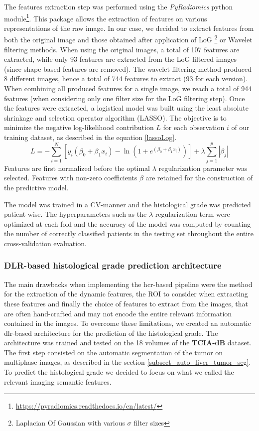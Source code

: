 \documentclass[]{article}
\newcommand{\lmttfont}[1]{{\fontfamily{lmtt}\selectfont #1}}
\begin{document}
The features extraction step was performed using the \textit{PyRadiomics} python module\footnote{\url{https://pyradiomics.readthedocs.io/en/latest/}}. This package allows the extraction of features on various representations of the raw image. In our case, we decided to extract features from both the original image and those obtained after application of LoG \footnote{Laplacian Of Gaussian with various $\sigma$ filter sizes} or Wavelet filtering methods. When using the original images, a total of 107 features are extracted, while only 93 features are extracted from the LoG filtered images (since shape-based features are removed). The wavelet filtering method produced 8 different images, hence a total of 744 features to extract (93 for each version). When combining all produced features for a single image, we reach a total of 944 features (when considering only one filter size for the LoG filtering step).
Once the features were extracted, a logistical model was built using the least absolute shrinkage and selection operator algorithm (LASSO). The objective is to minimize the negative log-likelihood contribution $L$ for each observation $ i $ of our training dataset, as described in the equation \ref{lassoLog}.
\begin{equation} \label{lassoLog}
L = -\sum_{i=1}^{N} \left[ y_{i} \left( {\beta}_{0} + {\beta}_{1} x_{i} \right) -\ln \left( 1+e^{({\beta}_{0} + {\beta}_{1} x_{i})} \right) \right] + \lambda \sum_{j=1}^{p} \left| {\beta}_{j} \right|
\end{equation}
Features are first normalized before the optimal $ \lambda  $ regularization parameter was selected. Features with non-zero coefficients $ \beta $ are retained for the construction of the predictive model.

The model was trained in a CV-manner and the histological grade was predicted patient-wise. The hyperparameters such as the $ \lambda $ regularization term were optimized at each fold and the accuracy of the model was computed by counting the number of correctly classified patients in the testing set throughout the entire cross-validation evaluation.

\subsubsection{DLR-based histological grade prediction architecture}\label{dlr-based_method}

The main drawbacks when implementing the \ac{hcr}-based pipeline were the method for the extraction of the dynamic features, the ROI to consider when extracting these features and finally the choice of features to extract from the images, that are often hand-crafted and may not encode the entire relevant information contained in the images.
To overcome these limitations, we created an automatic \ac{dlr}-based architecture for the prediction of the histological grade. The architecture was trained and tested on the 18 volumes of the \textbf{\lmttfont{TCIA-dB}} dataset.
The first step consisted on the automatic segmentation of the tumor on multiphase images, as described in the section \ref{subsect_auto_liver_tumor_seg}.
To predict the histological grade we decided to focus on what we called the
relevant imaging semantic features.
\end{document}
